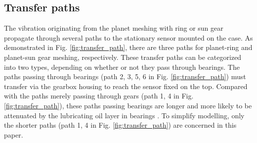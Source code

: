 \documentclass[a4paper,fleqn]{cas-sc}%
\begin{document}
\subsection{Transfer paths\label{sec:transfer_path}}
\par The vibration originating from the planet meshing with ring or sun gear propagate through several paths to the stationary sensor mounted on the case. As demonstrated in Fig. \ref{fig:transfer_path}, there are three paths for planet-ring and planet-sun gear meshing, respectively. These transfer paths can be categorized into two types, depending on whether or not they pass through bearings. The paths passing through bearings (path 2, 3, 5, 6 in Fig. \ref{fig:transfer_path}) must transfer via the gearbox housing to reach the sensor fixed on the top. Compared with the paths merely passing through gears (path 1, 4 in Fig. \ref{fig:transfer_path}), these paths passing bearings are longer and more likely to be attenuated by the lubricating oil layer in bearings \cite{Feng2012}. To simplify modelling, only the shorter paths (path 1, 4 in Fig. \ref{fig:transfer_path}) are concerned in this paper.
\end{document}
